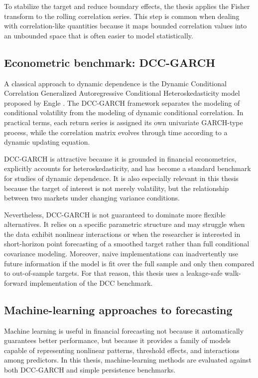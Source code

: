 To stabilize the target and reduce boundary effects, the thesis applies the Fisher transform to the rolling correlation series. This step is common when dealing with correlation-like quantities because it maps bounded correlation values into an unbounded space that is often easier to model statistically.

\subsection{Econometric benchmark: DCC-GARCH}

A classical approach to dynamic dependence is the Dynamic Conditional Correlation Generalized Autoregressive Conditional Heteroskedasticity model proposed by Engle \cite{engle2002}. The DCC-GARCH framework separates the modeling of conditional volatility from the modeling of dynamic conditional correlation. In practical terms, each return series is assigned its own univariate GARCH-type process, while the correlation matrix evolves through time according to a dynamic updating equation.

DCC-GARCH is attractive because it is grounded in financial econometrics, explicitly accounts for heteroskedasticity, and has become a standard benchmark for studies of dynamic dependence. It is also especially relevant in this thesis because the target of interest is not merely volatility, but the relationship between two markets under changing variance conditions.

Nevertheless, DCC-GARCH is not guaranteed to dominate more flexible alternatives. It relies on a specific parametric structure and may struggle when the data exhibit nonlinear interactions or when the researcher is interested in short-horizon point forecasting of a smoothed target rather than full conditional covariance modeling. Moreover, naive implementations can inadvertently use future information if the model is fit over the full sample and only then compared to out-of-sample targets. For that reason, this thesis uses a leakage-safe walk-forward implementation of the DCC benchmark.

\subsection{Machine-learning approaches to forecasting}

Machine learning is useful in financial forecasting not because it automatically guarantees better performance, but because it provides a family of models capable of representing nonlinear patterns, threshold effects, and interactions among predictors. In this thesis, machine-learning methods are evaluated against both DCC-GARCH and simple persistence benchmarks.

